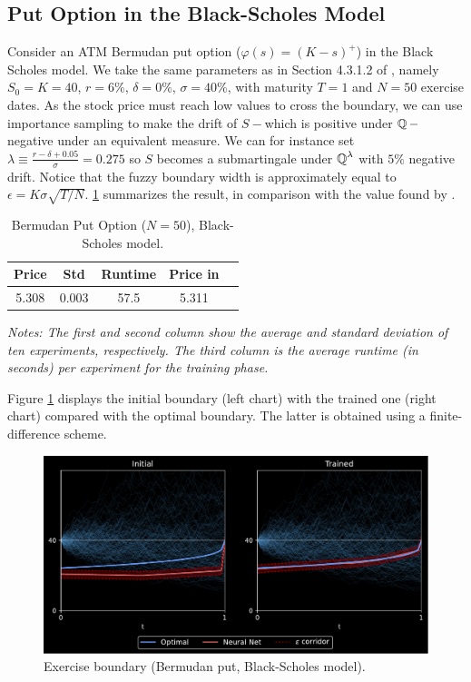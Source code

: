 \subsection{Put Option in the Black-Scholes Model} \label{sec:putBS}
Consider an ATM Bermudan put option ($\varphi(s) = (K-s)^+$) in the Black Scholes model. We take the same parameters as in  Section 4.3.1.2 of \cite{Becker2}, namely
$S_0=K=40$, $r = 6\%$, $\delta = 0\%$, $\sigma = 40\%$, with maturity $T=1$ and  $N=50$ exercise dates.  
As the stock price must reach low values to cross the boundary, we can use importance sampling to make the drift of $S-$which is positive under $\operatorname{\mathbb{Q}}-$negative under an equivalent measure. We can for instance set $\lambda \equiv \frac{r-\delta + 0.05}{\sigma}  = 0.275$ so $S$ becomes a submartingale under $\operatorname{\mathbb{Q}}^{\lambda}$ with $5\%$ negative drift. Notice that the fuzzy boundary width is approximately equal to $\epsilon = K\sigma \sqrt{T/N}$.  \cref{tab:resultPutBS} summarizes the result, in comparison with the value found by \citet{Becker1}. 

\begin{table}[ht]
  \centering
  \caption{Bermudan Put Option ($N=50$), Black-Scholes model.  
 }
  \begin{tabular}{|c| c| c| c| c|}
 \hline
     Price&  Std& Runtime  & Price in \cite{Becker2}\\
  \hline 
  5.308 & 0.003 &  57.5 & 5.311 \\
  \hline
\end{tabular}
\vspace{2mm}

\scriptsize{
\textit{Notes: The first and second column show the average and standard deviation of ten experiments, respectively. The third column is the average runtime (in seconds) per experiment for the training phase. }}
\label{tab:resultPutBS}
  \end{table}

Figure \ref{fig:putBS} displays the initial boundary (left chart) with the trained one (right chart) compared with the optimal boundary. The latter is obtained using a finite-difference scheme.  

\begin{figure}
    \centering
    \caption{Exercise boundary (Bermudan put,  Black-Scholes model).}
    \includegraphics[scale=0.5]{Figures/Bdry 2, lbda=0.275, mu=0.050, N=50.pdf}
    
    \label{fig:putBS}
\end{figure}


